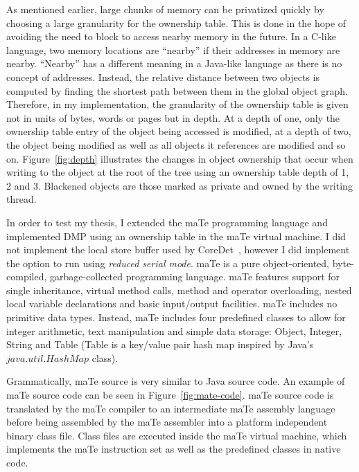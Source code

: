 As mentioned earlier, large chunks of memory can be privatized quickly
by choosing a large granularity for the ownership table.  This is done
in the hope of avoiding the need to block to access nearby memory in
the future.  In a C-like language, two memory locations are ``nearby''
if their addresses in memory are nearby.  ``Nearby'' has a different
meaning in a Java-like language as there is no concept of addresses.
Instead, the relative distance between two objects is computed by
finding the shortest path between them in the global object graph.
Therefore, in my implementation, the granularity of the ownership
table is given not in units of bytes, words or pages but in depth.  At
a depth of one, only the ownership table entry of the object being
accessed is modified, at a depth of two, the object being modified as
well as all objects it references are modified and so on.
Figure~\ref{fig:depth} illustrates the changes in object ownership
that occur when writing to the object at the root of the tree using an
ownership table depth of 1, 2 and 3.  Blackened objects are those
marked as private and owned by the writing thread.

In order to test my thesis, I extended the maTe programming language
and implemented DMP using an ownership table in the maTe virtual
machine.  I did not implement the local store buffer used by
CoreDet~\cite{coredet}, however I did implement the option to run
using \emph{reduced serial mode}.  maTe is a pure object-oriented,
byte-compiled, garbage-collected programming language.  maTe features
support for single inheritance, virtual method calls, method and
operator overloading, nested local variable declarations and basic
input/output facilities.  maTe includes no primitive data types.
Instead, maTe includes four predefined classes to allow for integer
arithmetic, text manipulation and simple data storage: Object,
Integer, String and Table (Table is a key/value pair hash map inspired
by Java's $java.util.HashMap$ class).

Grammatically, maTe source is very similar to Java source code.  An
example of maTe source code can be seen in Figure~\ref{fig:mate-code}.
maTe source code is translated by the maTe compiler to an intermediate
maTe assembly language before being assembled by the maTe assembler
into a platform independent binary class file.  Class files are
executed inside the maTe virtual machine, which implements the maTe
instruction set as well as the predefined classes in native code.

